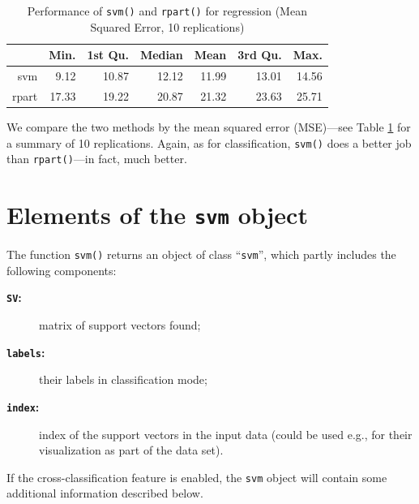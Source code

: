 \documentclass[a4paper]{article}
\begin{document}
\begin{Schunk}
\begin{table}[ht]
\begin{center}
\begin{tabular}{rrrrrrr}
\hline
 & Min. & 1st Qu. & Median & Mean & 3rd Qu. & Max. \\
\hline
svm & 9.12 & 10.87 & 12.12 & 11.99 & 13.01 & 14.56 \\
rpart & 17.33 & 19.22 & 20.87 & 21.32 & 23.63 & 25.71 \\
\hline
\end{tabular}
\caption{Performance of \texttt{svm()} and
       \texttt{rpart()} for regression (Mean Squared Error, 10 replications)}
\label{tab:reg}
\end{center}
\end{table}\end{Schunk}

\noindent We compare the two methods by the mean squared error (MSE)---see Table
\ref{tab:reg} for a summary of 10 replications. 
Again, as for classification, \texttt{svm()}
does a better job than \texttt{rpart()}---in fact, much better.

\section*{Elements of the \texttt{svm} object}

The function \texttt{svm()} returns an object of class ``\texttt{svm}'',
which partly includes the following components:

\begin{description}
 \item[\textbf{\texttt{SV}:}] matrix of support vectors found;
 \item[\textbf{\texttt{labels}:}] their labels in classification mode;
 \item[\textbf{\texttt{index}:}] index of the support vectors in the input data (could
  be used e.g., for their visualization as part of the data set).
\end{description}
If the cross-classification feature is enabled, the
\texttt{svm} object will contain some additional information described below.
\end{document}
